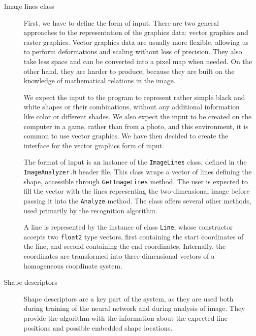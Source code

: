 \begin{description}
\item [Image lines class]
First, we have to define the form of input. There are two general approaches to the representation of the graphics data: vector graphics and raster graphics. Vector graphics data are usually more flexible, allowing us to perform deformations and scaling without loss of precision. They also take less space and can be converted into a pixel map when needed. On the other hand, they are harder to produce, because they are built on the knowledge of mathematical relations in the image. 

We expect the input to the program to represent rather simple black and white shapes or their combinations, without any additional information like color or different shades. We also expect the input to be created on the computer in a game, rather than from a photo, and this environment, it is common to use vector graphics. We have then decided to create the interface for the vector graphics form of input.

The format of input is an instance of the \texttt{ImageLines} class, defined in the \texttt{ImageAnalyzer.h} header file. This class wraps a vector of lines defining the shape, accessible through \texttt{GetImageLines} method. The user is expected to fill the vector with the lines representing the two-dimensional image before passing it into the \texttt{Analyze} method. The class offers several other methods, used primarily by the recognition algorithm. 

A line is represented by the instance of class \texttt{Line}, whose constructor accepts two \texttt{float2} type vectors, first containing the start coordinates of the line, and second containing the end coordinates. Internally, the coordinates are transformed into three-dimensional vectors of a homogeneous coordinate system. 

\item [Shape descriptors]
Shape descriptors are a key part of the system, as they are used both during training of the neural network and during analysis of image. They provide the algorithm  with the information about the expected line positions and possible embedded shape locations.


\end{description}
